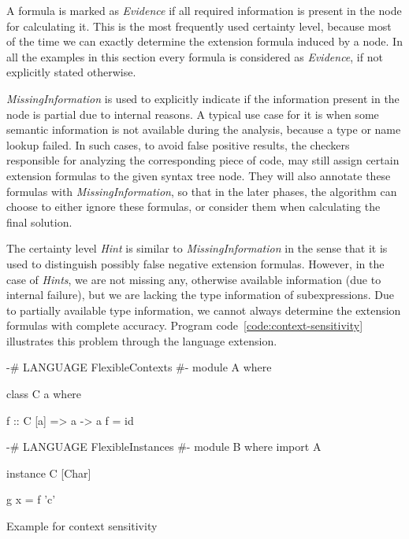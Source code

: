 \documentclass[main.tex]{subfiles}
\begin{document}
	A formula is marked as \emph{Evidence} if all required information is present in the node for calculating it. This is the most frequently used certainty level, because most of the time we can exactly determine the extension formula induced by a node. In all the examples in this section every formula is considered as \emph{Evidence}, if not explicitly stated otherwise.
	
	\emph{MissingInformation} is used to explicitly indicate if the information present in the node is partial due to internal reasons. A typical use case for it is when some semantic information is not available during the analysis, because a type or name lookup failed. In such cases, to avoid false positive results, the checkers responsible for analyzing the corresponding piece of code, may still assign certain extension formulas to the given syntax tree node. They will also annotate these formulas with \emph{MissingInformation}, so that in the later phases, the algorithm can choose to either ignore these formulas, or consider them when calculating the final solution.
	
	The certainty level \emph{Hint} is similar to \emph{MissingInformation} in the sense that it is used to distinguish possibly false negative extension formulas. However, in the case of \emph{Hints}, we are not missing any, otherwise available information (due to internal failure), but we are lacking the type information of subexpressions. Due to partially available type information, we cannot always determine the extension formulas with complete accuracy. Program code~\ref{code:context-sensitivity} illustrates this problem through the  language extension. 
		
	\noindent
	\begin{codeFloat}[H]
		\begin{minipage}{0.47\textwidth}
			\begin{haskell}
				{-# LANGUAGE FlexibleContexts #-}
				module A where
				
				class C a where
				
				f :: C [a] => a -> a
				f = id
			\end{haskell}
		\end{minipage}
		\hfill
		\begin{minipage}{0.50\textwidth}
			\begin{haskell}	
				{-# LANGUAGE FlexibleInstances #-}
				module B where		
				import A
				
				instance C [Char]
				
				g x = f 'c'
			\end{haskell}
		\end{minipage}
	\caption{Example for context sensitivity}
	\label{code:context-sensitivity}
	\end{codeFloat}
	
\end{document}
